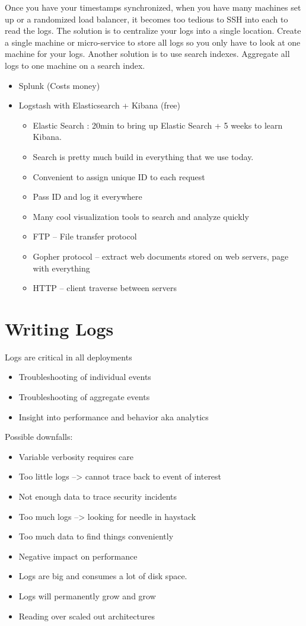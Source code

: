 \documentclass[fancy,11pt,titlestyle=display]{style/elegantbook}
\begin{document}
Once you have your timestamps synchronized, when you have many machines set up or a randomized load balancer, it becomes too tedious to SSH into each to read the logs.
The solution is to centralize your logs into a single location. Create a single machine or micro-service to store all logs so you only have to look at one machine for your logs. Another solution is to use search indexes. Aggregate all logs to one machine on a search index.
\begin{itemize}
    \item Splunk (Costs money)
    \item Logstash with Elasticsearch + Kibana (free)
    \begin{itemize}
        \item Elastic Search : 20min to bring up Elastic Search + 5 weeks to learn Kibana.
        \item Search is pretty much build in everything that we use today.
        \item Convenient to assign unique ID to each request
        \item Pass ID and log it everywhere
        \item Many cool visualization tools to search and analyze quickly
        \item FTP – File transfer protocol
        \item Gopher protocol – extract web documents stored on web servers, page with everything 
        \item HTTP – client traverse between servers
     \end{itemize}
\end{itemize}
\section{Writing Logs}

Logs are critical in all deployments
\begin{itemize}
    \item Troubleshooting of individual events
    \item Troubleshooting of aggregate events
    \item Insight into performance and behavior aka analytics
\end{itemize}


\noindent Possible downfalls:
\begin{itemize}
    \item Variable verbosity requires care
    \item Too little logs --> cannot trace back to event of interest
    \item Not enough data to trace security incidents
    \item Too much logs --> looking for needle in haystack
    \item Too much data to find things conveniently
    \item Negative impact on performance
    \item Logs are big and consumes a lot of disk space.
    \item Logs will permanently grow and grow
    \item Reading over scaled out architectures
\end{itemize}
\end{document}
